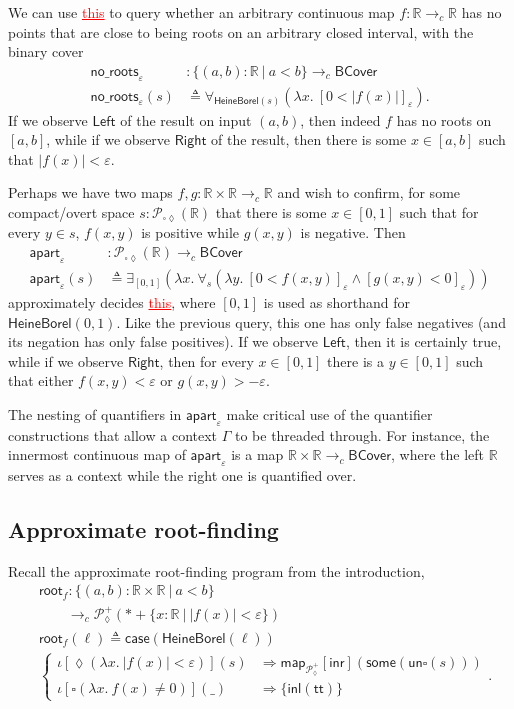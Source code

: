 \documentclass[conference]{IEEEtran}
\newcommand{\PLower}{\mathcal{P}_\lozenge}
\newcommand{\Viet}{\mathcal{P}_{\square\lozenge}}
\newcommand{\cto}{\to_c}
\newcommand{\R}{\mathbb{R}}
\newcommand{\map}[2]{\mathsf{map}_{#1}[{#2}]}
\newcommand{\fun}[2]{\lambda {#1}.\  {#2}}
\newcommand{\suchthat}{\ |\ }
\newcommand{\One}{\ast}
\newcommand{\wildcard}{\_}
\newcommand{\oinclf}[1]{\iota[{#1}]}
\newcommand{\oincl}[2]{\oinclf{#1} \left({#2}\right)}
\newcommand{\Branch}{\Rightarrow}
\newcommand{\BCover}{\mathsf{BCover}}
\newcommand{\RootFindingCode}{
&\mathsf{root}_f : \{ (a, b) : \R \times \R \suchthat a < b \}
  \\ &\qquad \cto \PLower^+(\One + \{ x : \R \suchthat |f(x)| < \varepsilon \})
\\ &\mathsf{root}_f(\ell) \triangleq \mathsf{case}(\mathsf{HeineBorel}(\ell))
\\ &\begin{cases}
\oincl{\lozenge (\fun{x}{|f(x)| < \varepsilon})}{s} 
  &\Branch \map{\PLower^+}{\mathsf{inr}}(\mathsf{some}(\mathsf{un}\square(s)))
\\ \oincl{\square (\fun{x}{f(x) \neq 0})}{\wildcard}
  &\Branch \{ \mathsf{inl}(\mathsf{tt}) \}
\end{cases}
}
\newcommand{\grammar}[1]{\textcolor{red}{\underline{#1}}}
\begin{document}
We can use \grammar{this} to query whether an arbitrary continuous map $f : \R \cto \R$ has no points that are close to being roots on an arbitrary closed interval, with the binary cover
\begin{align*}
\mathsf{no\_roots}_{\varepsilon} &: \{ (a, b) : \R \suchthat a < b\} \cto \BCover
\\ \mathsf{no\_roots}_\varepsilon(s) &\triangleq
  \forall_{\mathsf{HeineBorel}(s)}(\fun{x}{[ 0 < |f(x)| ]_\varepsilon}).
\end{align*}
If we observe $\mathsf{Left}$ of the result on input $(a, b)$, then indeed $f$ has no roots on $[a, b]$, while if we observe $\mathsf{Right}$ of the result, then there is some $x \in [a, b]$ such that $|f(x)| < \varepsilon$.

Perhaps we have two maps $f, g : \R \times \R \cto \R$ and wish to confirm, for some compact/overt space $s : \Viet(\R)$ that there is some $x \in [0,1]$ such that for every $y \in s$, $f(x, y)$ is positive while $g(x,y)$ is negative. Then
\begin{align*}
\mathsf{apart}_{\varepsilon} &: \Viet(\R) \cto \BCover
\\ \mathsf{apart}_\varepsilon(s) &\triangleq
  \exists_{[0,1]}(\fun{x}{\forall_{s}(\fun{y}{[ 0 < f(x, y) ]_\varepsilon \wedge [g(x, y) < 0]_\varepsilon})})
\end{align*}
approximately decides \grammar{this}, where $[0,1]$ is used as shorthand for $\mathsf{HeineBorel}(0,1)$.
Like the previous query, this one has only false negatives (and its negation has only false positives). If we observe $\mathsf{Left}$, then it is certainly true, while if we observe $\mathsf{Right}$, then for every $x \in [0,1]$ there is a $y \in [0,1]$ such that either $f(x, y) < \varepsilon$ or $g(x, y) > -\varepsilon$.

The nesting of quantifiers in $\mathsf{apart}_\varepsilon$ make critical use of the quantifier constructions that allow a context $\Gamma$ to be threaded through. For instance, the innermost continuous map of $\mathsf{apart}_\varepsilon$ is a map $\R \times \R \cto \BCover$, where the left $\R$ serves as a context while the right one is quantified over.

\subsection{Approximate root-finding}
\label{s:bcov:root}

Recall the approximate root-finding program from the introduction,
\begin{align*}
\RootFindingCode.
\end{align*}
\end{document}

